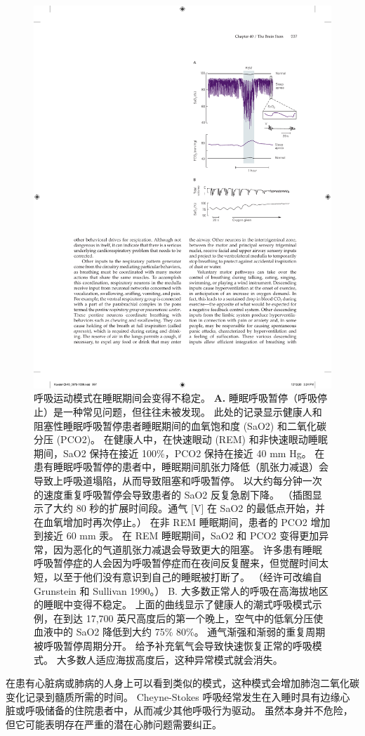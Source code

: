 \begin{figure}[htbp]
	\centering
	\includegraphics[width=0.5\linewidth]{chap40/fig_40_10}
	\caption{呼吸运动模式在睡眠期间会变得不稳定。
		\textbf{A.} 睡眠呼吸暂停（呼吸停止）是一种常见问题，但往往未被发现。
		此处的记录显示健康人和阻塞性睡眠呼吸暂停患者睡眠期间的血氧饱和度 (SaO2) 和二氧化碳分压 (PCO2)。
		在健康人中，在快速眼动 (REM) 和非快速眼动睡眠期间，SaO2 保持在接近 100\%，PCO2 保持在接近 40 mm Hg。
		在患有睡眠呼吸暂停的患者中，睡眠期间肌张力降低（肌张力减退）会导致上呼吸道塌陷，从而导致阻塞和呼吸暂停。
		以大约每分钟一次的速度重复呼吸暂停会导致患者的 SaO2 反复急剧下降。
		（插图显示了大约 80 秒的扩展时间段。通气 [V] 在 SaO2 的最低点开始，并在血氧增加时再次停止。）
		在非 REM 睡眠期间，患者的 PCO2 增加到接近 60 mm 汞。 
		在 REM 睡眠期间，SaO2 和 PCO2 变得更加异常，因为恶化的气道肌张力减退会导致更大的阻塞。
		许多患有睡眠呼吸暂停症的人会因为呼吸暂停症而在夜间反复醒来，但觉醒时间太短，以至于他们没有意识到自己的睡眠被打断了。 
		（经许可改编自 Grunstein 和 Sullivan 1990。）
		B. 大多数正常人的呼吸在高海拔地区的睡眠中变得不稳定。
		上面的曲线显示了健康人的潮式呼吸模式示例，在到达 17,700 英尺高度后的第一个晚上，空气中的低氧分压使血液中的 SaO2 降低到大约 75\% 80\%。
		通气渐强和渐弱的重复周期被呼吸暂停周期分开。
		给予补充氧气会导致快速恢复正常的呼吸模式。
		大多数人适应海拔高度后，这种异常模式就会消失\cite{lahiri1984sleep}。}
	\label{fig:40_10}
\end{figure}


在患有心脏病或肺病的人身上可以看到类似的模式，这种模式会增加肺泡二氧化碳变化记录到髓质所需的时间。
Cheyne-Stokes 呼吸经常发生在入睡时具有边缘心脏或呼吸储备的住院患者中，从而减少其他呼吸行为驱动。
虽然本身并不危险，但它可能表明存在严重的潜在心肺问题需要纠正。


